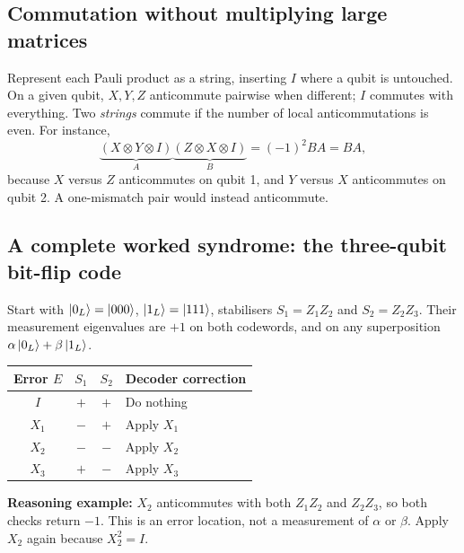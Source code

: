 \subsection{Commutation without multiplying large matrices}
Represent each Pauli product as a string, inserting $I$ where a qubit is untouched. On a given qubit, $X,Y,Z$ anticommute pairwise when different; $I$ commutes with everything. Two \emph{strings} commute if the number of local anticommutations is even. For instance,
\begin{equation}
\underbrace{(X\otimes Y\otimes I)}_{A}
\underbrace{(Z\otimes X\otimes I)}_{B}
=(-1)^2BA=BA,
\end{equation}
because $X$ versus $Z$ anticommutes on qubit 1, and $Y$ versus $X$ anticommutes on qubit 2. A one-mismatch pair would instead anticommute.

\subsection{A complete worked syndrome: the three-qubit bit-flip code}
Start with $\left\lvert 0_L\right\rangle=\left\lvert 000\right\rangle$, $\left\lvert 1_L\right\rangle=\left\lvert 111\right\rangle$, stabilisers $S_1=Z_1Z_2$ and $S_2=Z_2Z_3$. Their measurement eigenvalues are $+1$ on both codewords, and on any superposition $\alpha\left\lvert 0_L\right\rangle+\beta\left\lvert 1_L\right\rangle$.
\begin{center}
\small
\begin{tabular}{@{}cccl@{}}\toprule
Error $E$&$S_1$&$S_2$&Decoder correction\\\midrule
$I$&$+$&$+$&Do nothing\\
$X_1$&$-$&$+$&Apply $X_1$\\
$X_2$&$-$&$-$&Apply $X_2$\\
$X_3$&$+$&$-$&Apply $X_3$\\\bottomrule
\end{tabular}
\end{center}
\textbf{Reasoning example:} $X_2$ anticommutes with both $Z_1Z_2$ and $Z_2Z_3$, so both checks return $-1$. This is an error location, not a measurement of $\alpha$ or $\beta$. Apply $X_2$ again because $X_2^2=I$.

